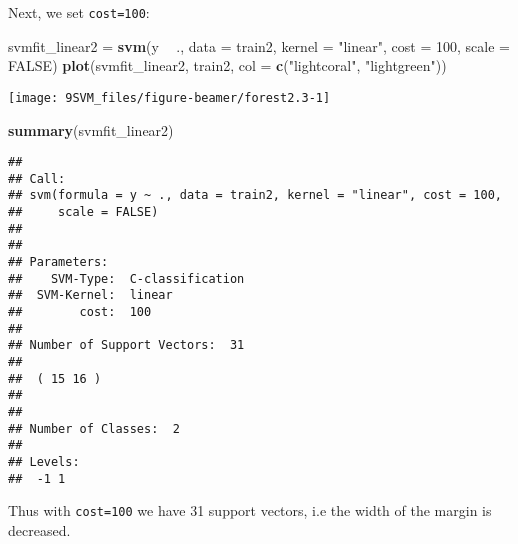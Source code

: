 \documentclass[10pt,ignorenonframetext,]{beamer}
\newenvironment{Shaded}{\begin{snugshade}}{\end{snugshade}}
\newcommand{\DataTypeTok}[1]{\textcolor[rgb]{0.13,0.29,0.53}{#1}}
\newcommand{\DecValTok}[1]{\textcolor[rgb]{0.00,0.00,0.81}{#1}}
\newcommand{\KeywordTok}[1]{\textcolor[rgb]{0.13,0.29,0.53}{\textbf{#1}}}
\newcommand{\NormalTok}[1]{#1}
\newcommand{\OperatorTok}[1]{\textcolor[rgb]{0.81,0.36,0.00}{\textbf{#1}}}
\newcommand{\OtherTok}[1]{\textcolor[rgb]{0.56,0.35,0.01}{#1}}
\newcommand{\StringTok}[1]{\textcolor[rgb]{0.31,0.60,0.02}{#1}}
\begin{document}
\begin{frame}[fragile]

Next, we set \texttt{cost=100}:

\scriptsize

\begin{Shaded}
\begin{Highlighting}[]
\NormalTok{svmfit_linear2 =}\StringTok{ }\KeywordTok{svm}\NormalTok{(y }\OperatorTok{~}\StringTok{ }\NormalTok{., }\DataTypeTok{data =}\NormalTok{ train2, }\DataTypeTok{kernel =} \StringTok{"linear"}\NormalTok{, }\DataTypeTok{cost =} \DecValTok{100}\NormalTok{, }
    \DataTypeTok{scale =} \OtherTok{FALSE}\NormalTok{)}
\KeywordTok{plot}\NormalTok{(svmfit_linear2, train2, }\DataTypeTok{col =} \KeywordTok{c}\NormalTok{(}\StringTok{"lightcoral"}\NormalTok{, }\StringTok{"lightgreen"}\NormalTok{))}
\end{Highlighting}
\end{Shaded}

\begin{center}\texttt{[image: 9SVM\_files/figure-beamer/forest2.3-1]} \end{center}

\end{frame}

\begin{frame}[fragile]

\scriptsize

\begin{Shaded}
\begin{Highlighting}[]
\KeywordTok{summary}\NormalTok{(svmfit_linear2)}
\end{Highlighting}
\end{Shaded}

\begin{verbatim}
## 
## Call:
## svm(formula = y ~ ., data = train2, kernel = "linear", cost = 100, 
##     scale = FALSE)
## 
## 
## Parameters:
##    SVM-Type:  C-classification 
##  SVM-Kernel:  linear 
##        cost:  100 
## 
## Number of Support Vectors:  31
## 
##  ( 15 16 )
## 
## 
## Number of Classes:  2 
## 
## Levels: 
##  -1 1
\end{verbatim}

\normalsize

Thus with \texttt{cost=100} we have 31 support vectors, i.e the width of
the margin is decreased.

\end{frame}
\end{document}

